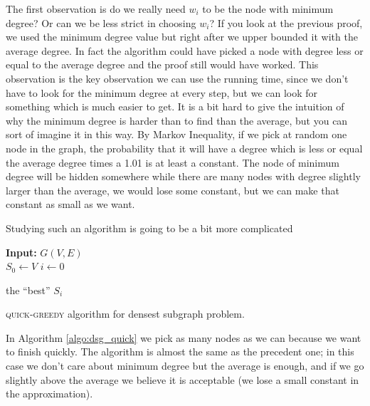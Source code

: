 The first observation is do we really need $w_i$ to be the node with minimum degree? Or can we be less strict in choosing $w_i$? If you look at the previous proof, we used the minimum degree value but right after we upper bounded it with the average degree. In fact the algorithm could have picked a node with degree less or equal to the average degree and the proof still would have worked. This observation is the key observation we can use the running time, since we don't have to look for the minimum degree at every step, but we can look for something which is much easier to get. It is a bit hard to give the intuition of why the minimum degree is harder than to find than the average, but you can sort of imagine it in this way. By Markov Inequality, if we pick at random one node in the graph, the probability that it will have a degree which is less or equal the average degree times a 1.01 is at least a constant. The node of minimum degree will be hidden somewhere while there are many nodes with degree slightly larger than the average, we would lose some constant, but we can make that constant as small as we want.

Studying such an algorithm is going to be a bit more complicated 
\begin{algorithm}
	\textbf{Input:} $G(V, E)$\\
	$S_0 \gets V$\;
	$i \gets 0$\;
	
	\Return the ``best'' $S_i$
	\vspace{15pt}
	\caption{\textsc{quick-greedy} algorithm for densest subgraph problem.}
	\label{algo:dsg_quick}
\end{algorithm}

In Algorithm \ref{algo:dsg_quick} we pick as many nodes as we can because we want to finish quickly. The algorithm is almost the same as the precedent one; in this case we don't care about minimum degree but the average is enough, and if we go slightly above the average we believe it is acceptable (we lose a small constant in the approximation). 

